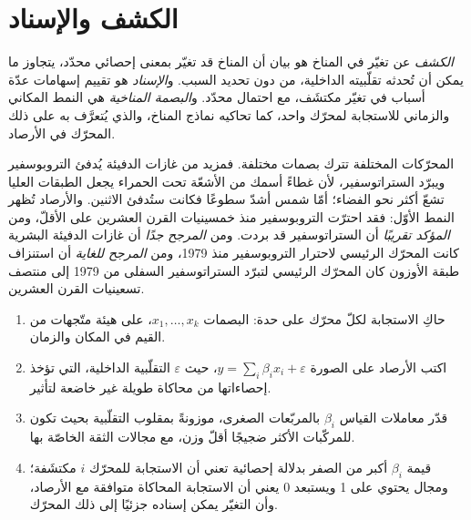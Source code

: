 \section{الكشف والإسناد}\label{sec:b2:anthropogenic-climate-change:attribution}

\begin{definition}\label{def:b2:anthropogenic-climate-change:da}
\emph{الكشف} عن تغيّر في المناخ هو بيان أن
المناخ قد تغيّر بمعنى إحصائي محدّد، يتجاوز ما يمكن أن تُحدثه تقلّبيته الداخلية،
من دون تحديد السبب. و\emph{الإسناد} هو تقييم
إسهامات عدّة أسباب في تغيّر مكتشَف، مع احتمال محدّد. و\emph{البصمة
المناخية} هي النمط المكاني والزماني للاستجابة لمحرّك
واحد، كما تحاكيه نماذج المناخ، والذي يُتعرَّف به على ذلك المحرّك في الأرصاد.
\end{definition}

المحرّكات المختلفة تترك بصمات مختلفة. فمزيد من غازات الدفيئة يُدفئ التروبوسفير ويبرّد
الستراتوسفير، لأن غطاءً أسمك من الأشعّة تحت الحمراء يجعل الطبقات العليا تشعّ أكثر نحو الفضاء؛
أمّا شمس أشدّ سطوعًا فكانت ستُدفئ الاثنين. والأرصاد تُظهر النمط الأوّل: فقد احترّت التروبوسفير
منذ خمسينيات القرن العشرين على الأقلّ، ومن \emph{المؤكد تقريبًا} أن الستراتوسفير قد بردت. ومن
\emph{المرجح جدًا} أن غازات الدفيئة البشرية كانت المحرّك الرئيسي لاحترار التروبوسفير
منذ 1979، ومن \emph{المرجح للغاية} أن استنزاف طبقة الأوزون كان المحرّك الرئيسي
لتبرّد الستراتوسفير السفلى من 1979 إلى منتصف تسعينيات القرن العشرين.

\begin{method}\label{met:b2:anthropogenic-climate-change:fingerprinting}
\begin{enumerate}
  \item حاكِ الاستجابة لكلّ محرّك على حدة: البصمات $x_1, \dots, x_k$، على هيئة
        متّجهات من القيم في المكان والزمان.
  \item اكتب الأرصاد على الصورة $y = \sum_i \beta_i x_i + \varepsilon$، حيث $\varepsilon$
        التقلّبية الداخلية، التي تؤخذ إحصاءاتها من محاكاة طويلة غير خاضعة لتأثير.
  \item قدّر معاملات القياس $\beta_i$ بالمربّعات الصغرى، موزونةً بمقلوب
        التقلّبية بحيث تكون للمركّبات الأكثر ضجيجًا أقلّ وزن، مع مجالات الثقة الخاصّة بها.
  \item قيمة $\beta_i$ أكبر من الصفر بدلالة إحصائية تعني أن الاستجابة للمحرّك $i$
        مكتشَفة؛ ومجال يحتوي على 1 ويستبعد 0 يعني أن الاستجابة المحاكاة
        متوافقة مع الأرصاد، وأن التغيّر يمكن إسناده جزئيًا إلى ذلك المحرّك.
\end{enumerate}
\end{method}

